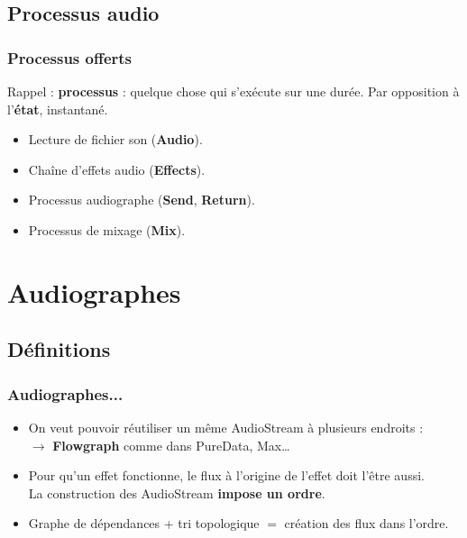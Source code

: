 \documentclass{beamer}
\begin{document}
\subsection{Processus audio}
\begin{frame}	
	\frametitle{Processus offerts}    
	\Large
	Rappel : \textbf{processus} : quelque chose qui s'exécute sur une durée. Par opposition à l'\textbf{état}, instantané.
	\begin{itemize}
		\item Lecture de fichier son (\textbf{Audio}).
		\item Chaîne d'effets audio (\textbf{Effects}).
		\item Processus audiographe (\textbf{Send}, \textbf{Return}).
		\item Processus de mixage (\textbf{Mix}).
	\end{itemize}    
\end{frame}

\section{Audiographes}
\subsection{Définitions}
\begin{frame}
	\frametitle{Audiographes...}    
	\Large
	\begin{itemize}
		\item On veut pouvoir réutiliser un même AudioStream à plusieurs endroits :  \\ $\rightarrow$ \textbf{Flowgraph} comme dans PureData, Max\dots
		\item Pour qu'un effet fonctionne, le flux à l'origine de l'effet doit l'être aussi.~\\
		La construction des AudioStream \textbf{impose un ordre}.
		\item Graphe de dépendances + tri topologique $=$ création des flux dans l'ordre.
	\end{itemize}    
\end{frame}
\end{document}
